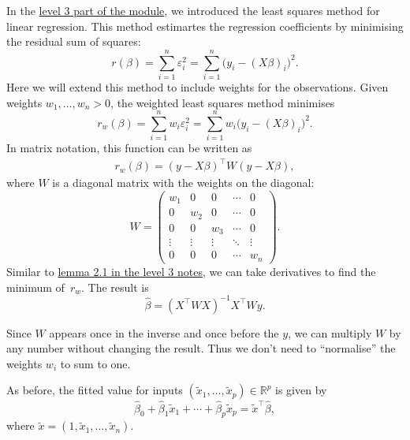 \documentclass[
  a4paper,
]{article}
\theoremstyle{definition}
\theoremstyle{definition}
\theoremstyle{definition}
\theoremstyle{definition}
\theoremstyle{remark}
\begin{document}
In the \href{https://seehuhn.github.io/MATH3714/S02-multiple.html\#the-normal-equations}{level 3 part of the module},
we introduced the least squares method for linear regression. This method
estimartes the regression coefficients by minimising the residual sum of
squares:
\begin{equation*}
  r(\beta)
  = \sum_{i=1}^n \varepsilon_i^2
  = \sum_{i=1}^n \bigl( y_i - (X\beta)_i \bigr)^2.
\end{equation*}
Here we will extend this method to include weights for the observations.
Given weights
\(w_1, \ldots, w_n > 0\), the weighted least squares method minimises
\begin{equation*}
  r_w(\beta)
  = \sum_{i=1}^n w_i \varepsilon_i^2
  = \sum_{i=1}^n w_i \bigl( y_i - (X\beta)_i \bigr)^2.
\end{equation*}
In matrix notation, this function can be written as
\begin{align*}
  r_w(\beta)
  = (y - X \beta)^\top W (y - X \beta),
\end{align*}
where \(W\) is a diagonal matrix with the weights on the diagonal:
\begin{equation}
  W
  = \begin{pmatrix}
      w_1 & 0 & 0 & \cdots & 0 \\
      0 & w_2 & 0 & \cdots & 0 \\
      0 & 0 & w_3 & \cdots & 0 \\
      \vdots & \vdots & \vdots & \ddots & \vdots \\
      0 & 0 & 0 & \cdots & w_n
    \end{pmatrix}.  \label{eq:W-diagonal}
\end{equation}
Similar to \href{https://seehuhn.github.io/MATH3714/S02-multiple.html\#lem:multiple-LSQ}{lemma 2.1 in the level 3 notes},
we can take derivatives to find
the minimum of~\(r_w\). The result is
\begin{equation*}
  \hat\beta
  = (X^\top W X)^{-1} X^\top W y.
\end{equation*}

Since \(W\) appears once in the inverse and once before the \(y\), we can
multiply \(W\) by any number without changing the result. Thus we don't
need to ``normalise'' the weights \(w_i\) to sum to one.

As before, the fitted value for inputs \((\tilde x_1, \ldots, \tilde x_p) \in \mathbb{R}^p\) is given by
\begin{equation*}
  \hat\beta_0 + \hat\beta_1 \tilde x_1 + \cdots + \hat\beta_p \tilde x_p
  = \tilde x^\top \hat\beta,
\end{equation*}
where \(\tilde x = (1, \tilde x_1, \ldots, \tilde x_n)\).
\end{document}
